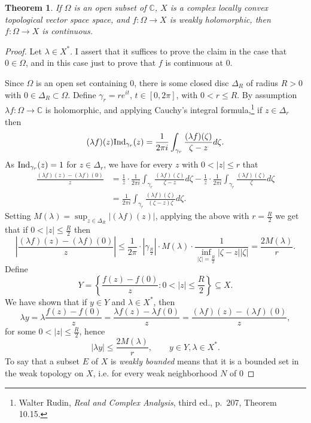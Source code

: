 \documentclass{article}
\newcommand{\Ind}{\ensuremath\mathrm{Ind}}
\newtheorem{theorem}{Theorem}
\theoremstyle{definition}
\begin{document}
\begin{theorem}
If $\Omega$ is an open subset of $\mathbb{C}$, $X$ is a complex locally convex topological vector
space space, and $f:\Omega \to X$ is weakly
holomorphic, then  $f:\Omega \to X$ is continuous.
\label{weakcontinuous}
\end{theorem}
\begin{proof}
Let $\lambda \in X^*$.
I assert that it suffices to prove the claim in the case that $0 \in \Omega$, and in this case just to prove that $f$ is continuous at $0$. 

Since $\Omega$ is an open set containing $0$, there is some closed disc $\Delta_R$ of radius $R>0$ with $0\in \Delta_R \subset \Omega$.
Define $\gamma_r=re^{it}$, $t \in [0,2\pi]$, with  $0<r \leq R$. By assumption $\lambda f:\Omega \to \mathbb{C}$ is holomorphic,
and applying Cauchy's integral formula,\footnote{Walter Rudin,
 {\em Real and Complex Analysis}, third ed., p.~207, Theorem 10.15.} if $z \in \Delta_r$ then
 \[
 (\lambda f)(z)  \Ind_{\gamma_r}(z)=\frac{1}{2\pi i} \int_{\gamma_r} \frac{(\lambda f)(\zeta)}{\zeta-z} d\zeta.
 \]
 As $\Ind_{\gamma_r}(z)=1$ for $z \in \Delta_r$, we have for every $z$ with $0<|z| \leq r$  that
 \begin{align*}
 \frac{(\lambda f)(z)-(\lambda f)(0)}{z} &= \frac{1}{z}\cdot \frac{1}{2\pi i} \int_{\gamma_r} \frac{(\lambda f)(\zeta)}{\zeta-z} d\zeta
 -\frac{1}{z}\cdot \frac{1}{2\pi i} \int_{\gamma_r} \frac{(\lambda f)(\zeta)}{\zeta} d\zeta\\
 &=\frac{1}{2\pi i} \int_{\gamma_r} \frac{(\lambda f)(\zeta)}{(\zeta-z)\zeta} d\zeta.
\end{align*}
Setting $M(\lambda)=\sup_{z \in \Delta_R} |(\lambda f)(z)|$, applying the above with $r=\frac{R}{2}$ we get that if $0<|z| \leq \frac{R}{2}$ then 
\[
\left|  \frac{(\lambda f)(z)-(\lambda f)(0)}{z} \right| \leq \frac{1}{2\pi} \cdot |\gamma_{\frac{R}{2}}| \cdot M(\lambda) \cdot \frac{1}{\inf_{|\zeta|=\frac{R}{2}} |\zeta-z| |\zeta|}
=\frac{2M(\lambda)}{r}.
\]
Define
\[
Y=\left\{ \frac{f(z)-f(0)}{z}: 0<|z| \leq \frac{R}{2} \right\} \subseteq X.
\]
We have shown that if $y \in Y$ and $\lambda \in X^*$, then
\[
\lambda y = \lambda \frac{f(z)-f(0)}{z} = \frac{\lambda f(z)-\lambda f(0)}{z}=\frac{(\lambda f)(z)-(\lambda f)(0)}{z},
\]
for some $0<|z| \leq \frac{R}{2}$,
hence 
\[
|\lambda y| \leq \frac{2M(\lambda)}{r}, \qquad y \in Y, \lambda \in X^*.
\]
To say that a subset $E$ of $X$ is {\em weakly bounded} means that it is a bounded set in the weak topology on $X$, i.e. for every weak neighborhood $N$ of $0$

\end{proof}
\end{document}
